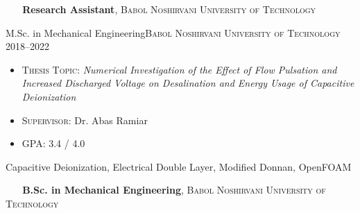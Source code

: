 
\vspace{1pt}
\begin{scholarship}
  {\textbf{\ \ \ \textbf{Research Assistant}}, {\textsc{Babol Noshirvani University of Technology}}}
\end{scholarship}

\vspace{-3pt}

\begin{experiences}
  \experience
  {}   {M.Sc. in Mechanical Engineering}{\normalfont\textsc{Babol Noshirvani University of Technology}}{}
  {2018--2022\ \ \ \ } {
    \begin{itemize}
      \item \textsc{Thesis Topic}: {\emph{Numerical Investigation of the Effect of Flow Pulsation and Increased Discharged Voltage on Desalination and Energy Usage of Capacitive Deionization}}
      \item \textsc{Supervisor}: {Dr. Abas Ramiar}
      \item \textsc{GPA}: 3.4 / 4.0
        \vspace{3pt}
    \end{itemize}
  }
  {Capacitive Deionization, Electrical Double Layer, Modified Donnan, OpenFOAM}
\end{experiences}
\vspace{-20pt}
\begin{scholarship}
  {\textbf{\ \ \ \textbf{B.Sc. in Mechanical Engineering}}, \textsc{Babol Noshirvani University of Technology}}
\end{scholarship}
\vspace{2pt}
